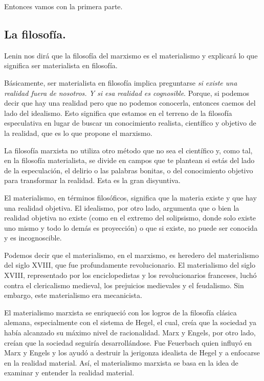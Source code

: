 \documentclass[
  a4paper,
]{article}
\begin{document}
Entonces vamos con la primera parte.

\subsection{La filosofía.}\label{la-filosofuxeda.}

Lenin nos dirá que la filosofía del marxismo es el materialismo y
explicará lo que significa ser materialista en filosofía.

Básicamente, ser materialista en filosofía implica preguntarse \emph{si
existe una realidad fuera de nosotros. Y si esa realidad es cognosible}.
Porque, si podemos decir que hay una realidad pero que no podemos
conocerla, entonces caemos del lado del idealismo. Esto significa que
estamos en el terreno de la filosofía especulativa en lugar de buscar un
conocimiento realista, científico y objetivo de la realidad, que es lo
que propone el marxismo.

La filosofía marxista no utiliza otro método que no sea el científico y,
como tal, en la filosofía materialista, se divide en campos que te
plantean si estás del lado de la especulación, el delirio o las palabras
bonitas, o del conocimiento objetivo para transformar la realidad. Esta
es la gran disyuntiva.

El materialismo, en términos filosóficos, significa que la materia
existe y que hay una realidad objetiva. El idealismo, por otro lado,
argumenta que o bien la realidad objetiva no existe (como en el extremo
del solipsismo, donde solo existe uno mismo y todo lo demás es
proyección) o que si existe, no puede ser conocida y es incognoscible.

Podemos decir que el materialismo, en el marxismo, es heredero del
materialismo del siglo XVIII, que fue profundamente revolucionario. El
materialismo del siglo XVIII, representado por los enciclopedistas y los
revolucionarios franceses, luchó contra el clericalismo medieval, los
prejuicios medievales y el feudalismo. Sin embargo, este materialismo
era mecanicista.

El materialismo marxista se enriqueció con los logros de la filosofía
clásica alemana, especialmente con el sistema de Hegel, el cual, creía
que la sociedad ya había alcanzado su máximo nivel de racionalidad. Marx
y Engels, por otro lado, creían que la sociedad seguiría
desarrollándose. Fue Feuerbach quien influyó en Marx y Engels y los
ayudó a destruir la jerigonza idealista de Hegel y a enfocarse en la
realidad material. Así, el materialismo marxista se basa en la idea de
examinar y entender la realidad material.
\end{document}
